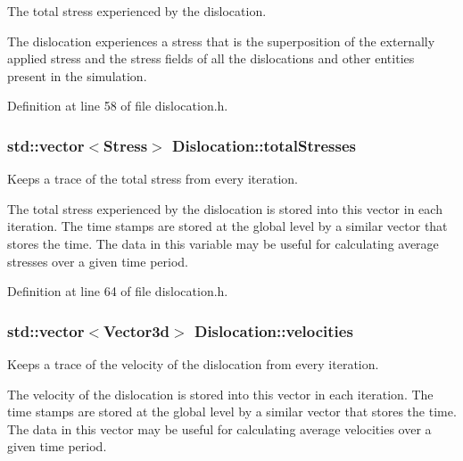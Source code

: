 The total stress experienced by the dislocation. 

The dislocation experiences a stress that is the superposition of the externally applied stress and the stress fields of all the dislocations and other entities present in the simulation. 

Definition at line 58 of file dislocation.\-h.

\hypertarget{classDislocation_adb36ed6c1772f2614ffbed4dcc748c13}{
\subsubsection[{total\-Stresses}]{\setlength{\rightskip}{0pt plus 5cm}std\-::vector$<${\bf Stress}$>$ Dislocation\-::total\-Stresses\hspace{0.3cm}{\ttfamily [protected]}}}\label{d3/dc6/classDislocation_adb36ed6c1772f2614ffbed4dcc748c13}


Keeps a trace of the total stress from every iteration. 

The total stress experienced by the dislocation is stored into this vector in each iteration. The time stamps are stored at the global level by a similar vector that stores the time. The data in this variable may be useful for calculating average stresses over a given time period. 

Definition at line 64 of file dislocation.\-h.

\hypertarget{classDislocation_a9ccdef63384a8b965e70f13920a852f8}{
\subsubsection[{velocities}]{\setlength{\rightskip}{0pt plus 5cm}std\-::vector$<${\bf Vector3d}$>$ Dislocation\-::velocities\hspace{0.3cm}{\ttfamily [protected]}}}\label{d3/dc6/classDislocation_a9ccdef63384a8b965e70f13920a852f8}


Keeps a trace of the velocity of the dislocation from every iteration. 

The velocity of the dislocation is stored into this vector in each iteration. The time stamps are stored at the global level by a similar vector that stores the time. The data in this vector may be useful for calculating average velocities over a given time period. 

